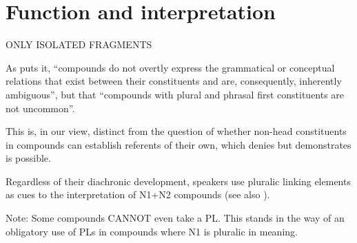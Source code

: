 \section{Function and interpretation}
\label{sec:functionandinterpretation}

ONLY ISOLATED FRAGMENTS

As \parencite[365--366]{Olsen2015} puts it, ``compounds do not overtly express the grammatical or conceptual relations that exist between their constituents and are, consequently, inherently ambiguous'', but that ``compounds with plural and phrasal first constituents are not uncommon''.

This is, in our view, distinct from the question of whether non-head constituents in compounds can establish referents of their own, which \textcite[366]{Olsen2015} denies but \textcite{Dressler1987} demonstrates is possible.


Regardless of their diachronic development, speakers use pluralic linking elements as cues to the interpretation of N1+N2 compounds (see also \citealt[212]{BangaEa2013b}).


Note: Some compounds CANNOT even take a PL.
This stands in the way of an obligatory use of PLs in compounds where N1 is pluralic in meaning.
